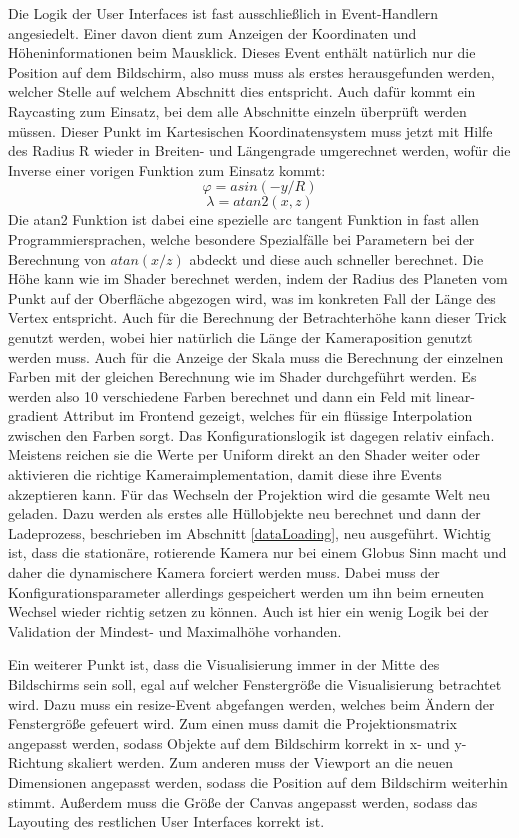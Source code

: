 Die Logik der User Interfaces ist fast ausschließlich in Event-Handlern angesiedelt. Einer davon dient zum Anzeigen der Koordinaten und Höheninformationen beim Mausklick. Dieses Event enthält natürlich nur die Position auf dem Bildschirm, also muss muss als erstes herausgefunden werden, welcher Stelle auf welchem Abschnitt dies entspricht. Auch dafür kommt ein Raycasting zum Einsatz, bei dem alle Abschnitte einzeln überprüft werden müssen. Dieser Punkt im Kartesischen Koordinatensystem muss jetzt mit Hilfe des Radius R wieder in Breiten- und Längengrade umgerechnet werden, wofür die Inverse einer vorigen Funktion zum Einsatz kommt: \[\varphi = asin(-y / R)\] \[\lambda = atan2(x, z)\]
Die atan2 Funktion ist dabei eine spezielle arc tangent Funktion in fast allen Programmiersprachen, welche besondere Spezialfälle bei Parametern bei der Berechnung von $atan(x / z)$ abdeckt und diese auch schneller berechnet. Die Höhe kann wie im Shader berechnet werden, indem der Radius des Planeten vom Punkt auf der Oberfläche abgezogen wird, was im konkreten Fall der Länge des Vertex entspricht. Auch für die Berechnung der Betrachterhöhe kann dieser Trick genutzt werden, wobei hier natürlich die Länge der Kameraposition genutzt werden muss. Auch für die Anzeige der Skala muss die Berechnung der einzelnen Farben mit der gleichen Berechnung wie im Shader durchgeführt werden. Es werden also 10 verschiedene Farben berechnet und dann ein Feld mit linear-gradient Attribut im Frontend gezeigt, welches für ein flüssige Interpolation zwischen den Farben sorgt. Das Konfigurationslogik ist dagegen relativ einfach. Meistens reichen sie die Werte per Uniform direkt an den Shader weiter oder aktivieren die richtige Kameraimplementation, damit diese ihre Events akzeptieren kann. Für das Wechseln der Projektion wird die gesamte Welt neu geladen. Dazu werden als erstes alle Hüllobjekte neu berechnet und dann der Ladeprozess, beschrieben im Abschnitt \ref{dataLoading}, neu ausgeführt. Wichtig ist, dass die stationäre, rotierende Kamera nur bei einem Globus Sinn macht und daher die dynamischere Kamera forciert werden muss. Dabei muss der Konfigurationsparameter allerdings gespeichert werden um ihn beim erneuten Wechsel wieder richtig setzen zu können. Auch ist hier ein wenig Logik bei der Validation der Mindest- und Maximalhöhe vorhanden.

Ein weiterer Punkt ist, dass die Visualisierung immer in der Mitte des Bildschirms sein soll, egal auf welcher Fenstergröße die Visualisierung betrachtet wird. Dazu muss ein resize-Event abgefangen werden, welches beim Ändern der Fenstergröße gefeuert wird. Zum einen muss damit die Projektionsmatrix angepasst werden, sodass Objekte auf dem Bildschirm korrekt in x- und y-Richtung skaliert werden. Zum anderen muss der Viewport an die neuen Dimensionen angepasst werden, sodass die Position auf dem Bildschirm weiterhin stimmt. Außerdem muss die Größe der Canvas angepasst werden, sodass das Layouting des restlichen User Interfaces korrekt ist.

